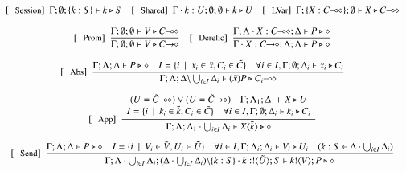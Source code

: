 \begin{figure}[!t]
\[
	\begin{array}{c}
		\trule{Session}~~\Gamma; \emptyset; \set{k:S} \proves k \hastype S 
		\quad
		\trule{Shared}~~\Gamma \cat k : U; \emptyset; \emptyset \proves k \hastype U
		\quad
		\trule{LVar}~~\Gamma; \set{X: \lhot{C}}; \emptyset \proves X \hastype \lhot{C}
		\\[4mm]

		\trule{Prom}~~\tree{
			\Gamma; \emptyset; \emptyset \proves V \hastype \lhot{C}
		}{
			\Gamma; \emptyset; \emptyset \proves V \hastype \shot{C}
		} 
		\quad
		\trule{Derelic}~~\tree{
			\Gamma; \Lambda \cat X : \lhot{C}; \Delta \proves P \hastype \Proc
		}{
			\Gamma \cat X:\shot{C}; \Lambda; \Delta \proves P \hastype \Proc
		}
		\\[6mm]

		\trule{Abs}~~\tree{
			\Gamma; \Lambda; \Delta \proves P \hastype \Proc
			\quad
			I = \set{i \setbar x_i \in \tilde{x}, C_i \in \tilde{C}}
			\quad
			\forall i \in I, \Gamma; \es; \Delta_i \proves x_i \hastype C_i
		}{
			\Gamma; \Lambda; \Delta \backslash \bigcup_{i \in I} \Delta_i \proves \abs{\tilde{x}}{P} \hastype \lhot{C_i}
		}
		\\[6mm]

		\trule{App}~~\tree{
			\begin{array}{c}
				(U = \lhot{\tilde{C}}) \lor (U = \shot{\tilde{C}})
				\quad
				\Gamma; \Lambda_1; \Delta_1 \proves X \hastype U
				\\
				I = \set{i \setbar k_i \in \tilde{k}, C_i \in \tilde{C}}
				\quad
				\forall i \in I, \Gamma; \es; \Delta_i \proves k_i \hastype C_i
			\end{array}
		}{
			\Gamma; \Lambda; \Delta_1 \cat \bigcup_{i \in I} \Delta_i \proves \appl{X}{\tilde{k}} \hastype \Proc
		} 
		\\[6mm]


		\trule{Send}~~\tree{
			\Gamma; \Lambda; \Delta \proves P \hastype \Proc
			\quad
			I = \set{i \setbar V_i \in \tilde{V}, U_i \in \tilde{U}}
			\quad
			\forall i \in I,
			\Gamma; \Lambda_i; \Delta_i \proves V_i \hastype U_i
			\quad
			(k:S \in \Delta \cat \bigcup_{i \in I} \Delta_i)
		}{
			\Gamma; \Lambda \cat \bigcup_{i \in I} \Lambda_i; (\Delta \cat \bigcup_{i \in I} \Delta_i)\backslash\set{k:S} \cat k:\btout{\tilde{U}} S \proves \bout{k}{V} P \hastype \Proc
		}
		\\[6mm]


\end{array}\]
\end{figure}
